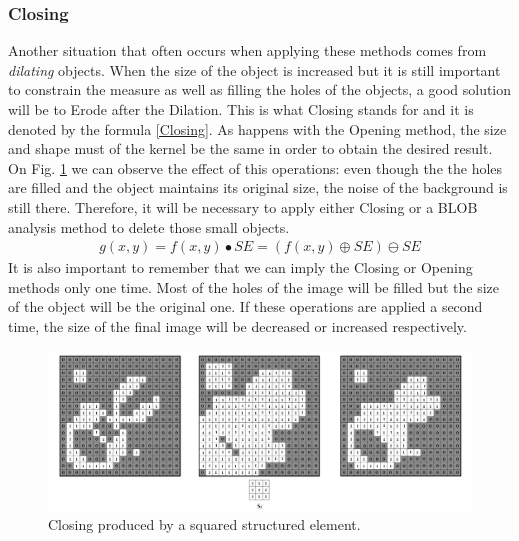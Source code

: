 \subsubsection{Closing}
Another situation that often occurs when applying these methods comes from \textit{dilating} objects. When the size of the object is increased but it is still important to constrain the measure as well as filling the holes of the objects, a good solution will be to Erode after the Dilation. This is what Closing stands for and it is denoted by the formula \ref{Closing}. As happens with the Opening method, the size and shape must of the kernel be the same in order to obtain the desired result.
On Fig. \ref{fig:Closing} we can observe the effect of this operations: even though the the holes are filled and the object maintains its original size, the noise of the background is still there. Therefore, it will be necessary to apply either Closing or a BLOB analysis method to delete those small objects.
\begin{equation}
\begin{aligned}
{g(x,y)}={f(x,y)}\bullet{SE}=({f(x,y)}\oplus{SE})\ominus{SE}
\label{Closing}
	\end{aligned}
\end{equation}
It is also important to remember that we can imply the Closing or Opening methods only one time. Most of the holes of the image will be filled but the size of the object will be the original one. If these operations are applied a second time, the size of the final image will be decreased or increased respectively.

\begin{figure}[htbp]
\centering
\includegraphics[width=1\textwidth]{Pictures/Theory/ClosingSq.png}
\caption{Closing produced by a squared structured element.}
\label{fig:Closing}
\end{figure}

